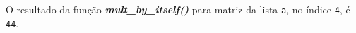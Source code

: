 \documentclass[12pt,varwidth=16cm,border=1pt]{standalone}
\begin{document}
O resultado da função \textbf{\textit{mult\_by\_itself()}} para matriz da lista \verb+a+, no índice \verb+4+, é \verb+44+.

\questiomtrue
\end{document}
